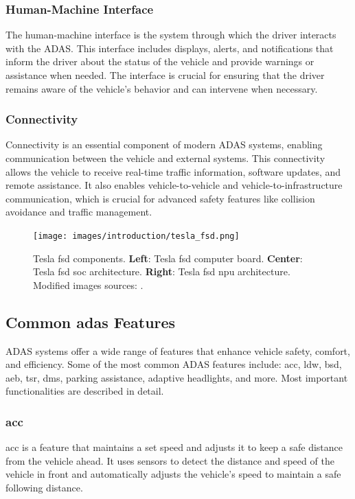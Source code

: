 \subsubsection*{Human-Machine Interface}
The human-machine interface is the system through which the driver interacts 
with the ADAS. This interface includes displays, alerts, and notifications that 
inform the driver about the status of the vehicle and provide warnings or 
assistance when needed. The interface is crucial for ensuring that the driver 
remains aware of the vehicle's behavior and can intervene when necessary.

\subsubsection*{Connectivity}
Connectivity is an essential component of modern ADAS systems, enabling 
communication between the vehicle and external systems. This connectivity allows 
the vehicle to receive real-time traffic information, software updates, and 
remote assistance. It also enables vehicle-to-vehicle and vehicle-to-infrastructure 
communication, which is crucial for advanced safety features like collision 
avoidance and traffic management.

\begin{figure}
    \centering
    \texttt{[image: images/introduction/tesla\_fsd.png]}
    \caption[Tesla \acs{fsd} computer board and \acs{soc} architecture]
    {Tesla \acf{fsd} components.
    \textbf{Left}: Tesla \acs{fsd} computer board.
    \textbf{Center}: Tesla \acs{fsd} \acf{soc} architecture.
    \textbf{Right}: Tesla \acs{fsd} \acf{npu} architecture.
    Modified images sources: 
    \cites{wikichip_2024_tesla_fsd_computer_board}{wikichip_2024_tesla_fsd_chip}{wikichip_2024_tesla_fsd_npu}.}
    \label{fig:adas_fsd}
\end{figure}

\subsection{Common \acs{adas} Features}
ADAS systems offer a wide range of features that enhance vehicle safety, 
comfort, and efficiency. Some of the most common ADAS features include: 
\ac*{acc}, \ac*{ldw}, \ac*{bsd}, \ac*{aeb}, \ac*{tsr}, \ac*{dms}, parking assistance,
adaptive headlights, and more. Most important functionalities are described in detail.

\subsubsection*{\ac{acc}}
\ac{acc} is a feature that maintains a set speed and adjusts it to keep a safe 
distance from the vehicle ahead. It uses sensors to detect the distance and 
speed of the vehicle in front and automatically adjusts the vehicle's speed to
maintain a safe following distance.

